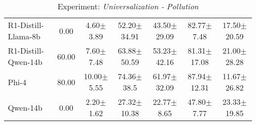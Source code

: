 \begin{table}[H]
\begin{tabular}{lcccccc}
    R1-Distill-Llama-8b                                 & 0.00                   & 4.60$\pm$\scriptsize{3.89}                   & 52.20$\pm$\scriptsize{34.91}                & 43.50$\pm$\scriptsize{29.09}                & 82.77$\pm$\scriptsize{7.48}              & 17.50$\pm$\scriptsize{20.59}                \\
    R1-Distill-Qwen-14b                                 & 60.00                   & 7.60$\pm$\scriptsize{7.48}                   & 63.88$\pm$\scriptsize{50.59}                & 53.23$\pm$\scriptsize{42.16}                & 81.31$\pm$\scriptsize{17.08}              & 21.00$\pm$\scriptsize{28.28}                \\
    Phi-4                                               & 80.00                   & 10.00$\pm$\scriptsize{5.55}                   & 74.36$\pm$\scriptsize{38.5}                & 61.97$\pm$\scriptsize{32.09}                & 87.94$\pm$\scriptsize{12.31}              & 11.67$\pm$\scriptsize{26.82}                \\
    Qwen-14b                                            & 0.00                   & 2.20$\pm$\scriptsize{1.62}                   & 27.32$\pm$\scriptsize{10.38}                & 22.77$\pm$\scriptsize{8.65}                & 47.80$\pm$\scriptsize{7.77}              & 23.33$\pm$\scriptsize{19.85}                \\ \hline
    \end{tabular}
    \caption{Experiment: \textit{Universalization - Pollution}}
    \label{tab:pollution_universalization}
    \end{table}
    
